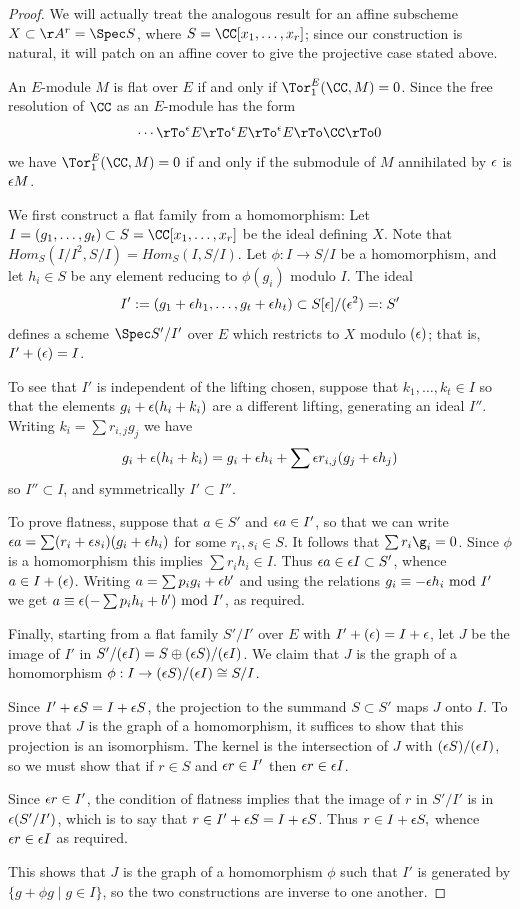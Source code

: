 \begin{proof}
We will actually treat the analogous result for an affine subscheme $X \subset \AA^r = \Spec S$, where
$S = \CC[x_{1}, \dots, x_{r}]$; since our construction is natural, it will patch on an affine cover to give the projective case stated above. 

An $E$-module $M$ is flat  over $E$ if and only if $\Tor_1^E(\CC,M) = 0$. 
Since the free resolution of $\CC$ as an $E$-module has the form
$$
\cdots \rTo^\eps E \rTo^\eps E \rTo^\eps E \rTo \CC \rTo 0
$$
we have $\Tor_1^E(\CC,M)=0$ if and only if the submodule of $M$ annihilated by $\eps$ is $\eps M$.

We first construct a flat family from a homomorphism: Let $I = (g_1,\dots, g_t)\subset S = \CC[x_1,\dots, x_r]$ be the ideal defining $X$. 
Note that $Hom_S(I/I^2, S/I) = Hom_S(I,S/I)$. Let $\phi: I\to S/I$ be a homomorphism, and let $h_i\in S$ be
any element reducing to $\phi(g_i)$ modulo $I$.  The ideal
$$
I' := (g_1+\eps h_1,\dots, g_t+\eps h_t)\subset S[\eps]/(\eps^2) =: S'
$$
defines a scheme $\Spec S'/I'$  over $E$ which restricts to $X$ modulo $(\eps)$; that is, $I' +(\eps) = I$. 

To see that $I'$ is 
independent of the lifting chosen, suppose that $k_1,\dots,k_t\in I$ so that the elements $g_i+\eps(h_i+k_i)$ are a different lifting,
generating an ideal $I''$.
Writing $k_i = \sum r_{i,j}g_j$ we have 
$$
g_i+\eps(h_i+k_i) = g_i+\eps h_i+ \sum \eps r_{i,j}(g_j+\eps h_j)
$$
 so 
$I'' \subset I$, and symmetrically $I' \subset I''$.

To prove flatness, suppose that $a\in S'$ and  $\eps a  \in I'$,
so that we can write  $\eps a= \sum(r_i+\eps s_i)(g_i+\eps h_i)$ for some $r_{i}, s_{i} \in S$.
It follows that 
$\sum r_i\g_i = 0$. Since $\phi$ is a homomorphism this implies $\sum r_i h_i \in I.$ Thus
$\eps a \in  \eps I\subset S'$, whence $a\in I + (\eps)$.  Writing $a =\sum p_i g_i+\eps b'$
and using the relations $g_i \equiv -\eps h_i \hbox{ mod } I'$ we get
 $a \equiv \eps (-\sum p_i h_i+b') \hbox{ mod } I'$, as required.

Finally, starting from a flat family $S'/I'$ over $E$ with $I' + (\eps) = I +\eps$, 
let $J$ be the image of $I'$ in $S'/(\eps I) = S \oplus (\eps S)/(\eps I)$. We claim that $J$ is the graph of a homomorphism $\phi: I \to  (\eps S)/(\eps I) \cong S/I$. 

Since $I' + \eps S = I +\eps S$,  the projection  to the  summand $S\subset S'$ maps $J$ onto $I$. 
To prove that $J$ is the graph of a homomorphism, it suffices to show that this projection is an isomorphism.
The kernel is
the intersection of $J$ with $(\eps S)/(\eps I )$, so we must show that
if $r\in S$ and $\eps r \in I'$ then $\eps r \in \eps I$. 

Since $\eps r \in I'$, the condition of flatness implies
that the image of $r$ in $S'/I'$ is in $\eps(S'/I')$, which is to say that $r \in I' + \eps S = I +\eps S$.
Thus $r \in  I + \eps S,$ whence $\eps  r \in \eps I$ as required.

This shows that
$J$ is the graph of a homomorphism $\phi$ such that
 $I'$ is generated by $\{g+\phi g\mid g\in I\}$, so the two constructions are inverse to one another.
\end{proof}

